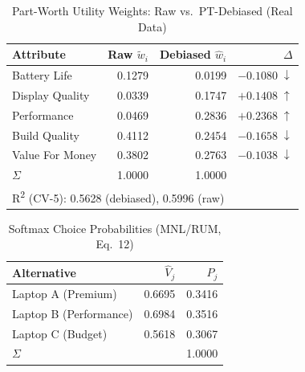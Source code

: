 \begin{table}[ht]
\centering
\caption{Part-Worth Utility Weights: Raw vs.\ PT-Debiased (Real Data)}
\label{tab:part_worths_empirical}
\begin{tabular}{lrrr}
\toprule
Attribute & Raw $\tilde{w}_i$ & Debiased $\hat{w}_i$ & $\Delta$ \\
\midrule
Battery Life & 0.1279 & 0.0199 & $-0.1080\;\downarrow$ \\
Display Quality & 0.0339 & 0.1747 & $+0.1408\;\uparrow$ \\
Performance & 0.0469 & 0.2836 & $+0.2368\;\uparrow$ \\
Build Quality & 0.4112 & 0.2454 & $-0.1658\;\downarrow$ \\
Value For Money & 0.3802 & 0.2763 & $-0.1038\;\downarrow$ \\
\midrule
$\Sigma$ & 1.0000 & 1.0000 & \\
\midrule
\multicolumn{4}{l}{R\textsuperscript{2} (CV-5): 0.5628 (debiased),
0.5996 (raw)}\\
\bottomrule
\end{tabular}
\end{table}

\begin{table}[ht]
\centering
\caption{Softmax Choice Probabilities (MNL/RUM, Eq.~12)}
\label{tab:choice_probs_empirical}
\begin{tabular}{lrr}
\toprule
Alternative & $\hat{V}_j$ & $P_j$ \\
\midrule
Laptop A (Premium) & 0.6695 & 0.3416 \\
Laptop B (Performance) & 0.6984 & 0.3516 \\
Laptop C (Budget) & 0.5618 & 0.3067 \\
\midrule
$\Sigma$ & & 1.0000 \\
\bottomrule
\end{tabular}
\end{table}